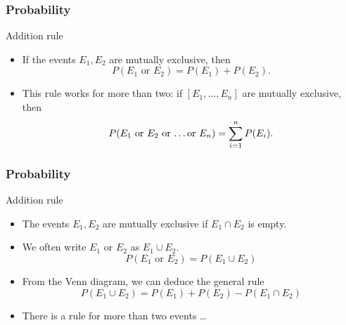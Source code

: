 \documentclass[handout]{beamer}
\begin{document}

   \begin{frame} \frametitle{Probability}

   \begin{block}
   {Addition rule}
   \begin{itemize}
   \item    If the events $E_1, E_2$ are mutually exclusive, then
   $$
   P(\text{$E_1$ or $E_2$}) = P(E_1) + P(E_2).
   $$
   \item This rule works for more than two: if $[E_1, \dots, E_n]$
     are mutually exclusive, then
   $$
   P(\text{$E_1$ or $E_2$ or \dots or $E_n$}) = \sum_{i=1}^n P(E_i).
   $$

   \end{itemize}
   \end{block}
   \end{frame}


   \begin{frame} \frametitle{Probability}

   \begin{block}
   {Addition rule}
   \begin{itemize}
   \item The events $E_1, E_2$ are mutually exclusive if $E_1 \cap E_2$ is empty.
   \item We often write $\text{$E_1$ or $E_2$}$ as $E_1 \cup E_2$.
   $$
   P(\text{$E_1$ or $E_2$}) = P(E_1 \cup E_2)
   $$

   \item From the Venn diagram, we can deduce the general rule
   $$
   P(E_1 \cup E_2) = P(E_1) + P(E_2) - P(E_1 \cap E_2)
   $$

   \item There is a rule for more than two events \dots
   \end{itemize}
   \end{block}
   \end{frame}

\end{document}
